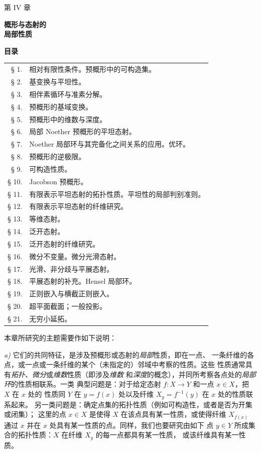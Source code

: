 \cleardoublepage
{}
\thispagestyle{plain}

\begin{center}
{\Large 第 IV 章}

\vspace{1.5cm}
{\LARGE\bfseries 概形与态射的\\[0.3em]
局部性质}

\vspace{1.5cm}
{\large\bfseries 目录}
\end{center}

\medskip
\begin{tabular}{@{}r p{}}
§ 1. & 相对有限性条件。预概形中的可构造集。\\
§ 2. & 基变换与平坦性。\\
§ 3. & 相伴素循环与准素分解。\\
§ 4. & 预概形的基域变换。\\
§ 5. & 预概形中的维数与深度。\\
§ 6. & 局部 Noether 预概形的平坦态射。\\
§ 7. & Noether 局部环与其完备化之间关系的应用。优环。\\
§ 8. & 预概形的逆极限。\\
§ 9. & 可构造性质。\\
§ 10. & Jacobson 预概形。\\
§ 11.\footnotemark[1] & 有限表示平坦态射的拓扑性质。平坦性的局部判别准则。\\
§ 12. & 有限表示平坦态射的纤维研究。\\
§ 13. & 等维态射。\\
§ 14. & 泛开态射。\\
§ 15. & 泛开态射的纤维研究。\\
§ 16. & 微分不变量。微分光滑态射。\\
§ 17. & 光滑、非分歧与平展态射。\\
§ 18. & 平展态射的补充。Hensel 局部环。\\
§ 19. & 正则嵌入与横截正则嵌入。\\
§ 20. & 超平面截面；一般投影。\\
§ 21. & 无穷小延拓。\\
\end{tabular}

\clearpage
{}

本章所研究的主题需要作如下说明：

\medskip
\noindent
\emph{a)} 它们的共同特征，是涉及预概形或态射的\emph{局部}性质，即在一点、
一条纤维的各点，或一点或一条纤维的某个（未指定的）邻域中考察的性质。这些
性质通常具有\emph{拓扑}、\emph{微分}或\emph{维数}性质（即涉及\emph{维数}
和\emph{深度}的概念），并同所考察各点处的\emph{局部环}的性质相联系。一类
典型问题是：对于给定态射 $f:X\to Y$ 和一点 $x\in X$，把 $X$ 在 $x$ 处的
性质同 $Y$ 在 $y=f(x)$ 处以及纤维 $X_y=f^{-1}(y)$ 在 $x$ 处的性质联系起来。
另一类问题是：确定点集的拓扑性质（例如可构造性，或者是否为开集或闭集）；
这里的点 $x\in X$ 是使得 $X$ 在该点具有某一性质，或使得纤维
$X_{f(x)}$ 通过 $x$ 并在 $x$ 处具有某一性质的点。同样，我们也要研究由如下
点 $y\in Y$ 所成集合的拓扑性质：$X$ 在纤维 $X_y$ 的每一点都具有某一性质，
或该纤维具有某一性质。

